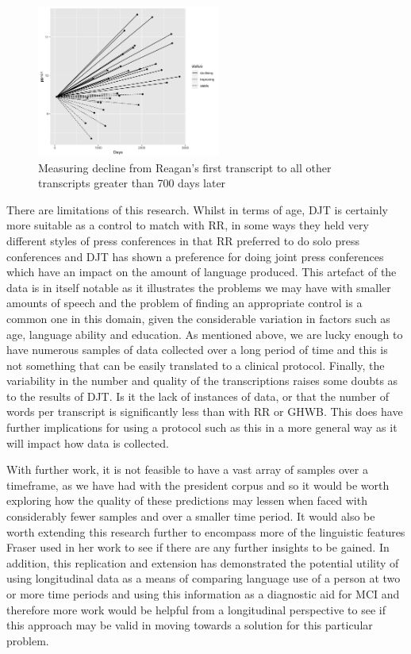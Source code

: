 \documentclass[12pt]{article}
\begin{document}
\begin{figure}[H]
	\centering
	\includegraphics[width=6cm, height=5cm]{plots/comp2.png}
	\caption{Measuring decline from Reagan's first transcript to all other transcripts greater than 700 days later}
\end{figure}
\par 
There are limitations of this research. Whilst in terms of age, DJT is certainly more suitable as a control to match with RR, in some ways they held very different styles of press conferences in that RR preferred to do solo press conferences and DJT has shown a preference for doing joint press conferences which have an impact on the amount of language produced. This artefact of the data is in itself notable as it illustrates the problems we may have with smaller amounts of speech and the problem of finding an appropriate control is a common one in this domain, given the considerable variation in factors such as age, language ability and education. As mentioned above, we are lucky enough to have numerous samples of data collected over a long period of time and this is not something that can be easily translated to a clinical protocol. Finally, the variability in the number and quality of the transcriptions raises some doubts as to the results of DJT. Is it the lack of instances of data, or that the number of words per transcript is significantly less than with RR or GHWB. This does have further implications for using a protocol such as this in a more general way as it will impact how data is collected. 
\par 
With further work, it is not feasible to have a vast array of samples over a timeframe, as we have had with the president corpus and so it would be worth exploring how the quality of these predictions may lessen when faced with considerably fewer samples and over a smaller time period. It would also be worth extending this research further to encompass more of the linguistic features Fraser used in her work \cite{Fraser2015} to see if there are any further insights to be gained. In addition, this replication and extension has demonstrated the potential utility of using longitudinal data as a means of comparing language use of a person at two or more time periods and using this information as a diagnostic aid for MCI and therefore more work would be helpful from a longitudinal perspective to see if this approach may be valid in moving towards a solution for this particular problem. 
\end{document}
